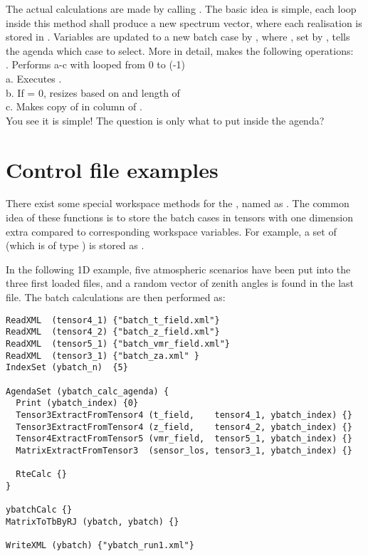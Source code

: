 The actual calculations are made by calling . The
basic idea is simple, each loop inside this method shall
produce a new spectrum vector, where each realisation is stored in
. Variables are updated to a new batch case by
, where , set by
, tells the agenda which case to select.
More in detail,  makes the following operations:\\
. Performs a-c with  looped from 0 to (-1)\\
\indent a. Executes .\\
\indent b. If  = 0, resizes  based
on  and length of  \\
\indent c. Makes copy of  in column  of .\\
You see it is simple! The question is only what to put inside the agenda?


\section{Control file examples}
%
There exist some special workspace methods for the
, named as
.  The common idea of these functions is to
store the batch cases in tensors with one dimension extra compared to
corresponding workspace variables. For example, a set of
 (which is of type ) is stored
as .

In the following 1D example, five atmospheric scenarios
have been put into the three first loaded files, and a random vector
of zenith angles is found in the last file. The batch calculations
are then performed as:

\begin{verbatim}
ReadXML  (tensor4_1) {"batch_t_field.xml"}
ReadXML  (tensor4_2) {"batch_z_field.xml"}
ReadXML  (tensor5_1) {"batch_vmr_field.xml"}
ReadXML  (tensor3_1) {"batch_za.xml" }
IndexSet (ybatch_n)  {5}

AgendaSet (ybatch_calc_agenda) {
  Print (ybatch_index) {0}
  Tensor3ExtractFromTensor4 (t_field,    tensor4_1, ybatch_index) {}
  Tensor3ExtractFromTensor4 (z_field,    tensor4_2, ybatch_index) {}
  Tensor4ExtractFromTensor5 (vmr_field,  tensor5_1, ybatch_index) {}
  MatrixExtractFromTensor3  (sensor_los, tensor3_1, ybatch_index) {}

  RteCalc {}
}

ybatchCalc {}
MatrixToTbByRJ (ybatch, ybatch) {}

WriteXML (ybatch) {"ybatch_run1.xml"}
\end{verbatim}

